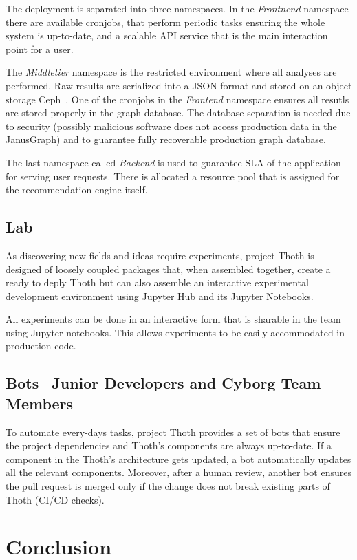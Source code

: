 \documentclass[a4paper]{llncs}
\begin{document}
The deployment is separated into three namespaces. In the \emph{Frontnend} namespace there are available cronjobs, that perform periodic tasks ensuring the whole system is up-to-date, and a scalable API service that is the main interaction point for a user.

The \emph{Middletier} namespace is the restricted environment where all analyses are performed. Raw results are serialized into a JSON format and stored on an object storage Ceph~\cite{ref_ceph}. One of the cronjobs in the \emph{Frontend} namespace ensures all resutls are stored properly in the graph database. The database separation is needed due to security (possibly malicious software does not access production data in the JanusGraph) and to guarantee fully recoverable production graph database.

The last namespace called \emph{Backend} is used to guarantee SLA of the application for serving user requests. There is allocated a resource pool that is assigned for the recommendation engine itself.

\subsection{Lab}

As discovering new fields and ideas require experiments, project Thoth is designed of loosely coupled packages that, when assembled together, create a ready to deply Thoth but can also assemble an interactive experimental development environment using Jupyter Hub and its Jupyter Notebooks.

All experiments can be done in an interactive form that is sharable in the team using Jupyter notebooks. This allows experiments to be easily accommodated in production code.

\subsection{Bots\,--\,Junior Developers and Cyborg Team Members}

To automate every-days tasks, project Thoth provides a set of bots that ensure the project dependencies and Thoth's components are always up-to-date. If a component in the Thoth's architecture gets updated, a bot automatically updates all the relevant components. Moreover, after a human review, another bot ensures the pull request is merged only if the change does not break existing parts of Thoth (CI/CD checks).

\section{Conclusion}
\end{document}
